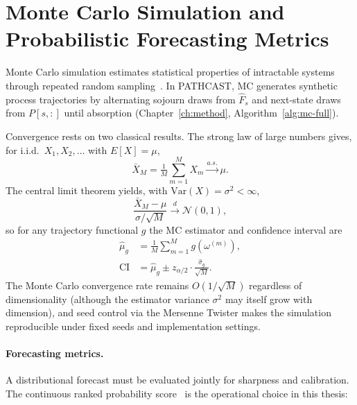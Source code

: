 \section{Monte Carlo Simulation and Probabilistic Forecasting Metrics}
\label{sec:monte-carlo}

Monte Carlo simulation estimates statistical properties of intractable
systems through repeated random sampling~\cite{metropolis1949monte,
robert2004monte}. In PATHCAST, MC generates synthetic process trajectories
by alternating sojourn draws from $\hat{F}_s$ and next-state draws from
$P[s,:]$ until absorption (Chapter~\ref{ch:method},
Algorithm~\ref{alg:mc-full}).

Convergence rests on two classical results. The strong law of large
numbers gives, for i.i.d.\ $X_1, X_2, \ldots$ with $E[X]=\mu$,
\begin{equation}
\label{eq:lln}
\bar{X}_M = \tfrac{1}{M}\sum_{m=1}^{M} X_m \xrightarrow{a.s.} \mu.
\end{equation}
The central limit theorem yields, with $\text{Var}(X)=\sigma^2 < \infty$,
\begin{equation}
\label{eq:clt}
\frac{\bar{X}_M - \mu}{\sigma/\sqrt{M}} \xrightarrow{d} \mathcal{N}(0,1),
\end{equation}
so for any trajectory functional $g$ the MC estimator and confidence
interval are
\begin{align}
\hat{\mu}_g &= \tfrac{1}{M}\sum_{m=1}^{M} g(\omega^{(m)}), \label{eq:mc-estimator} \\
\text{CI} &= \hat{\mu}_g \pm z_{\alpha/2} \cdot \tfrac{\hat{\sigma}_g}{\sqrt{M}}. \label{eq:mc-ci}
\end{align}
The Monte Carlo convergence rate remains $O(1/\sqrt{M})$ regardless of
dimensionality (although the estimator variance $\sigma^2$ may itself grow
with dimension), and seed control via the Mersenne Twister
makes the simulation reproducible under fixed seeds and implementation
settings.

\paragraph{Forecasting metrics.} A distributional forecast must be
evaluated jointly for sharpness and calibration. The continuous ranked
probability score~\cite{gneiting2007strictly} is the operational
choice in this thesis:

